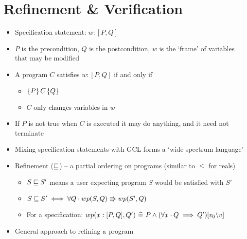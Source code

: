 \section{Refinement \& Verification}

\begin{itemize}
	
	\item Specification statement: $ w : [P, Q] $
	
	\item $ P $ is the precondition, $ Q $ is the postcondition, $ w $ is the `frame' of variables that may be modified
	
	\item A program $ C $ satisfies $ w : [P, Q] $ if and only if
	
	\begin{itemize}
		
		\item $ \left\lbrace P \right\rbrace C \left\lbrace Q \right\rbrace $
		
		\item $ C $ only changes variables in $ w $
		
	\end{itemize}

	\item If $ P $ is not true when $ C $ is executed it may do anything, and it need not terminate
	
	\item Mixing specification statements with GCL forms a `wide-spectrum language'
	
	\item Refinement ($ \mathrel{\sqsubseteq} $) -- a partial ordering on programs (similar to $ \le $ for reals)
	
	\begin{itemize}
		
		\item $ S \mathrel{\sqsubseteq} S' $ means a user expecting program $ S $ would be satisfied with $ S' $
		
		\item $ S \mathrel{\sqsubseteq} S' \iff \forall Q \cdot wp(S, Q) \Rrightarrow wp(S', Q) $
		
		\item For a specification: $ wp(x : [P, Q], Q') ~ \widehat{=} ~ P \land (\forall x \cdot Q \implies Q')[v_0 \backslash v] $
		
	\end{itemize}

	\item General approach to refining a program
	

\end{itemize}
